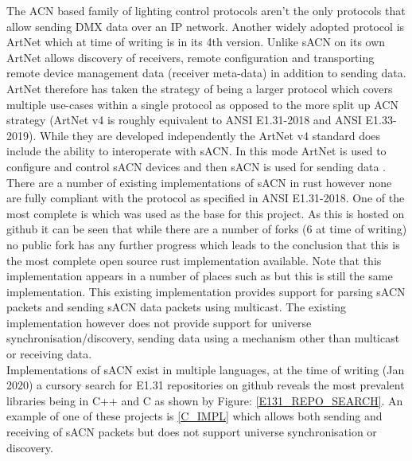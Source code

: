 \documentclass[11pt,a4paper]{article}
\begin{document}
The ACN based family of lighting control protocols aren't the only protocols that allow sending DMX data over an IP network. Another widely adopted protocol is ArtNet which at time of writing is in its 4th version. Unlike sACN on its own ArtNet allows discovery of receivers, remote configuration and transporting remote device management data (receiver meta-data) \cite{ARNET} in addition to sending data. ArtNet therefore has taken the strategy of being a larger protocol which covers multiple use-cases within a single protocol as opposed to the more split up ACN strategy (ArtNet v4 is roughly equivalent to ANSI E1.31-2018 and ANSI E1.33-2019). While they are developed independently the ArtNet v4 standard does include the ability to interoperate with sACN. In this mode ArtNet is used to configure and control sACN devices and then sACN is used for sending data \cite[Pg. 3]{ARTNET}.\\

There are a number of existing implementations of sACN in rust however none are fully compliant with the protocol as specified in ANSI E1.31-2018. One of the most complete is \cite{ORIGNIAL_IMPL} which was used as the base for this project. As this is hosted on github it can be seen that while there are a number of forks (6 at time of writing) no public fork has any further progress which leads to the conclusion that this is the most complete open source rust implementation available. Note that this implementation appears in a number of places such as \cite{ORIGINAL_IMPL_RUST_DOC} but this is still the same implementation. This existing implementation provides support for parsing sACN packets and sending sACN data packets using multicast. The existing implementation however does not provide support for universe synchronisation/discovery, sending data using a mechanism other than multicast or receiving data.\\

Implementations of sACN exist in multiple languages, at the time of writing (Jan 2020) a cursory search for E1.31 repositories on github reveals the most prevalent libraries being in C++ and C as shown by Figure: \ref{E131_REPO_SEARCH}. An example of one of these projects is \ref{C_IMPL} which allows both sending and receiving of sACN packets but does not support universe synchronisation or discovery.
\end{document}

